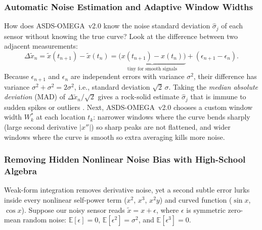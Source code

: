 \documentclass[11pt,a4paper]{article}
\begin{document}
\subsubsection{Automatic Noise Estimation and Adaptive Window Widths}
How does ASDS-OMEGA~v2.0 know the noise standard deviation $\hat{\sigma}_j$ of each sensor without knowing the true curve? Look at the difference between two adjacent measurements:
\begin{equation}
  \Delta \tilde{x}_n = \tilde{x}(t_{n+1}) - \tilde{x}(t_n)
  = \underbrace{\big(x(t_{n+1}) - x(t_n)\big)}_{\text{tiny for smooth signals}} + (\epsilon_{n+1} - \epsilon_n).
\end{equation}
Because $\epsilon_{n+1}$ and $\epsilon_n$ are independent errors with variance $\sigma^2$, their difference has variance $\sigma^2 + \sigma^2 = 2\sigma^2$, i.e., standard deviation $\sqrt{2}\,\sigma$. Taking the \emph{median absolute deviation} (MAD) of $\Delta \tilde{x}_n / \sqrt{2}$ gives a rock-solid estimate $\hat{\sigma}_j$ that is immune to sudden spikes or outliers \cite{donoho1994ideal}. Next, ASDS-OMEGA~v2.0 chooses a custom window width $W_k^*$ at each location $t_k$: narrower windows where the curve bends sharply (large second derivative $|x''|$) so sharp peaks are not flattened, and wider windows where the curve is smooth so extra averaging kills more noise.

\subsubsection{Removing Hidden Nonlinear Noise Bias with High-School Algebra}
Weak-form integration removes derivative noise, yet a second subtle error lurks inside every nonlinear self-power term ($x^2$, $x^3$, $x^2 y$) and curved function ($\sin x$, $\cos x$). Suppose our noisy sensor reads $\tilde{x} = x + \epsilon$, where $\epsilon$ is symmetric zero-mean random noise: $\mathbb{E}[\epsilon] = 0$, $\mathbb{E}[\epsilon^2] = \sigma^2$, and $\mathbb{E}[\epsilon^3] = 0$.
\end{document}
